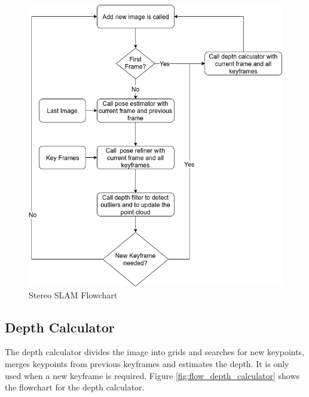 \documentclass[11pt,a4paper,titlepage,oneside]{report}
\begin{document}
\begin{figure}[H]
  \centering
  \includegraphics[scale=0.3]{img/flow_stereo_slam.png}
  \caption{Stereo SLAM Flowchart}\label{fig:flow_stereo_slam}
\end{figure}

\newpage\subsection{Depth Calculator}

The depth calculator divides the image into grids and searches for new keypoints, merges keypoints from previous keyframes and estimates the depth. It is only used when a new keyframe is required. Figure \ref{fig:flow_depth_calculator} shows the flowchart for the depth calculator.
\end{document}
